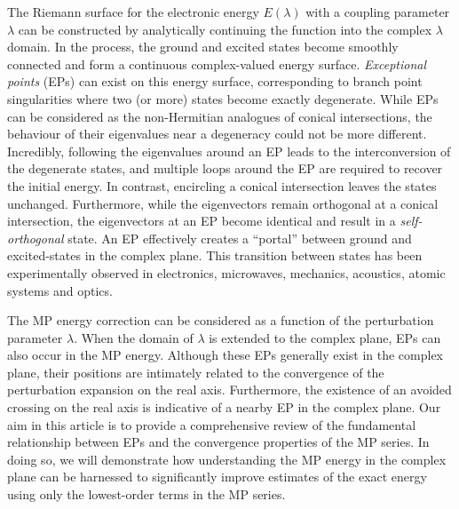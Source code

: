 \documentclass[aps,prb,reprint,noshowkeys,superscriptaddress]{revtex4-1}
\begin{document}
The Riemann surface for the electronic energy $E(\lambda)$ with a coupling parameter $\lambda$ can be 
constructed by analytically continuing the function into the complex $\lambda$ domain.
In the process, the ground and excited states become smoothly connected and form a continuous complex-valued
energy surface. 
\textit{Exceptional points} (EPs) can exist on this energy surface, corresponding to branch point 
singularities where two (or more) states become exactly degenerate.%
\cite{MoiseyevBook,Heiss_1988,Heiss_1990,Heiss_1999,Berry_2011,Heiss_2012,Heiss_2016,Benda_2018}
While EPs can be considered as the non-Hermitian analogues of conical intersections,\cite{Yarkony_1996} 
the behaviour of their eigenvalues near a degeneracy could not be more different.
Incredibly, following the eigenvalues around an EP leads to the interconversion of the degenerate states, 
and multiple loops around the EP are required to recover the initial energy.\cite{MoiseyevBook,Heiss_2016,Benda_2018}
In contrast, encircling a conical intersection leaves the states unchanged.
Furthermore, while the eigenvectors remain orthogonal at a conical intersection, the eigenvectors at an EP
become identical and result in a \textit{self-orthogonal} state. \cite{MoiseyevBook}
An EP effectively creates a ``portal'' between ground and excited-states in the complex plane.%
\cite{Burton_2019,Burton_2019a}
This transition between states has been experimentally observed in electronics, 
microwaves, mechanics, acoustics, atomic systems and optics.\cite{Bittner_2012,Chong_2011,Chtchelkatchev_2012,Doppler_2016,Guo_2009,Hang_2013,Liertzer_2012,Longhi_2010,Peng_2014, Peng_2014a,Regensburger_2012,Ruter_2010,Schindler_2011,Szameit_2011,Zhao_2010,Zheng_2013,Choi_2018,El-Ganainy_2018}

The MP energy correction can be considered as a function of the perturbation parameter $\lambda$.
When the domain of $\lambda$ is extended to the complex plane, EPs can also occur in the MP energy.
Although these EPs generally exist in the complex plane, their positions are intimately related to the 
convergence of the perturbation expansion on the real axis.%
\cite{BenderBook,Olsen_1996,Olsen_2000,Olsen_2019,Mihalka_2017a,Mihalka_2017b,Mihalka_2019}
Furthermore, the existence of an avoided crossing on the real axis is indicative of a nearby EP
in the complex plane.
Our aim in this article is to provide a comprehensive review of the fundamental relationship between EPs
and the convergence properties of the MP series.
In doing so, we will demonstrate how understanding the MP energy in the complex plane can 
be harnessed to significantly improve estimates of the exact energy using only the lowest-order terms
in the MP series.
\end{document}
